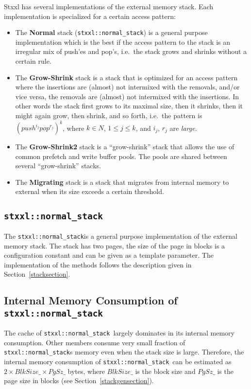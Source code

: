 \documentclass[twoside]{book}
\newcommand{\stxxl}{{\sc Stxxl} }
\begin{document}
\stxxl has several implementations of the external memory stack. Each 
implementation is specialized for a certain access pattern:
\begin{itemize}
\item The {\bf Normal } stack (\texttt{stxxl::normal\_stack}) is a general
purpose implementation which is the best if the access pattern
to the stack is an irregular mix of push'es and pop's, i.e.\ the stack
grows and shrinks without a certain rule.
\item The {\bf Grow-Shrink} stack is a stack that is optimized for an
access pattern where the insertions are (almost) not intermixed with
the removals, and/or vice versa, the removals are (almost) not
intermixed with the insertions. In other words the stack first grows
to its maximal size, then it shrinks, then it might again grow, then
shrink, and so forth, i.e.\ the pattern is
$(push^{i_j}pop^{r_j})^k$, where $k \in N$, $1\leq j\leq k$, and
$i_j$, $r_j$ are \emph{large}. 
\item The {\bf Grow-Shrink2} stack is a ``grow-shrink'' stack that
allows the use of common prefetch and write buffer pools. The pools
are shared between several ``grow-shrink'' stacks.
\item The {\bf Migrating} stack is a stack that migrates from
internal memory to external when its size exceeds a certain
threshold. 
\end{itemize}

\newcommand{\xnormalstack}{\texttt{stxxl::normal\_stack}}
\subsection{\xnormalstack}
The \xnormalstack is a general purpose implementation of the external
memory stack. The stack has two pages, the size of the page in blocks
is a configuration constant and can be given as a template
parameter. The implementation of the methods follows the description
given in Section~\ref{stacksection}.

\subsection*{Internal Memory Consumption of \xnormalstack}
The cache of \xnormalstack\ largely dominates in its internal memory
consumption. Other members consume very small fraction of
\xnormalstack s 
memory even when the stack size is large. Therefore, the internal
memory consumption of \xnormalstack\ can be estimated as
$2 \times BlkSize\_ \times PgSz\_$ bytes, where $BlkSize\_$ is the
block size and $PgSz\_$ is the page size in blocks (see
Section~\ref{stackgensection}). 
\end{document}
